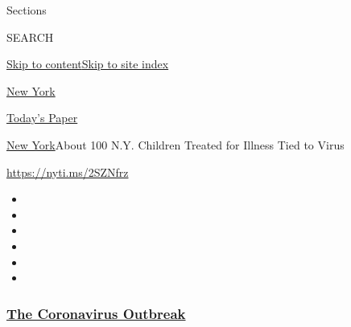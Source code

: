Sections

SEARCH

\protect\hyperlink{site-content}{Skip to
content}\protect\hyperlink{site-index}{Skip to site index}

\href{https://www.nytimes3xbfgragh.onion/section/nyregion}{New York}

\href{https://myaccount.nytimes3xbfgragh.onion/auth/login?response_type=cookie\&client_id=vi}{}

\href{https://www.nytimes3xbfgragh.onion/section/todayspaper}{Today's
Paper}

\href{/section/nyregion}{New York}\textbar{}About 100 N.Y. Children
Treated for Illness Tied to Virus

\url{https://nyti.ms/2SZNfrz}

\begin{itemize}
\item
\item
\item
\item
\item
\item
\end{itemize}

\hypertarget{the-coronavirus-outbreak}{%
\subsubsection{\texorpdfstring{\href{https://www.nytimes3xbfgragh.onion/news-event/coronavirus?name=styln-coronavirus-national\&region=TOP_BANNER\&block=storyline_menu_recirc\&action=click\&pgtype=Article\&impression_id=66c6f1a0-f1da-11ea-8359-5d2adecad97a\&variant=undefined}{The
Coronavirus
Outbreak}}{The Coronavirus Outbreak}}\label{the-coronavirus-outbreak}}

